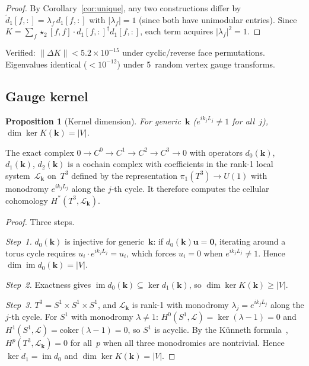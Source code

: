 \documentclass[12pt]{article}
\newtheorem{proposition}[theorem]{Proposition}
\theoremstyle{definition}
\theoremstyle{remark}
\newcommand{\kk}{\mathbf{k}}
\DeclareMathOperator{\im}{im}
\DeclareMathOperator{\cker}{ker}
\begin{document}
\begin{proof}
By Corollary~\ref{cor:unique}, any two constructions differ by
$\tilde{d}_1[f,:] = \lambda_f\,d_1[f,:]$ with $|\lambda_f| = 1$ (since both
have unimodular entries). Since
$K = \sum_f \star_2[f,f] \cdot d_1[f,:]^\dagger d_1[f,:]$, each term acquires
$|\lambda_f|^2 = 1$.
\end{proof}

Verified: $\|\Delta K\| < 5.2 \times 10^{-15}$ under cyclic/reverse face
permutations. Eigenvalues identical ($< 10^{-12}$) under 5~random vertex
gauge transforms.

\subsection{Gauge kernel}

\begin{proposition}[Kernel dimension]\label{prop:kernel}
For generic~$\kk$ ($e^{ik_j L_j} \neq 1$ for all~$j$),
$\dim\cker K(\kk) = |V|$.
\end{proposition}

The exact complex $0 \to C^0 \to C^1 \to C^2 \to C^3 \to 0$ with operators
$d_0(\kk)$, $d_1(\kk)$, $d_2(\kk)$ is a cochain complex with coefficients in
the rank-1 local system~$\mathcal{L}_\kk$ on~$T^3$ defined by the
representation $\pi_1(T^3) \to U(1)$ with monodromy $e^{ik_j L_j}$ along the
$j$-th cycle. It therefore computes the cellular cohomology
$H^*(T^3, \mathcal{L}_\kk)$.

\begin{proof}
Three steps.

\emph{Step~1.} $d_0(\kk)$ is injective for generic~$\kk$: if
$d_0(\kk)\mathbf{u} = \mathbf{0}$, iterating around a torus cycle requires
$u_i \cdot e^{ik_j L_j} = u_i$, which forces $u_i = 0$ when
$e^{ik_j L_j} \neq 1$. Hence $\dim\im d_0(\kk) = |V|$.

\emph{Step~2.} Exactness gives $\im d_0(\kk) \subseteq \cker d_1(\kk)$, so
$\dim\cker K(\kk) \geq |V|$.

\emph{Step~3.} $T^3 = S^1 \times S^1 \times S^1$, and $\mathcal{L}_\kk$ is
rank-1 with monodromy $\lambda_j = e^{ik_j L_j}$ along the $j$-th cycle. For
$S^1$ with monodromy $\lambda \neq 1$: $H^0(S^1, \mathcal{L}) =
\cker(\lambda - 1) = 0$ and $H^1(S^1, \mathcal{L}) =
\mathrm{coker}(\lambda - 1) = 0$, so $S^1$ is acyclic. By the K\"unneth
formula~\cite{BottTu1982,Hatcher2002}, $H^p(T^3, \mathcal{L}_\kk) = 0$ for all~$p$ when
all three monodromies are nontrivial. Hence $\cker d_1 = \im d_0$ and
$\dim\cker K(\kk) = |V|$.
\end{proof}
\end{document}
